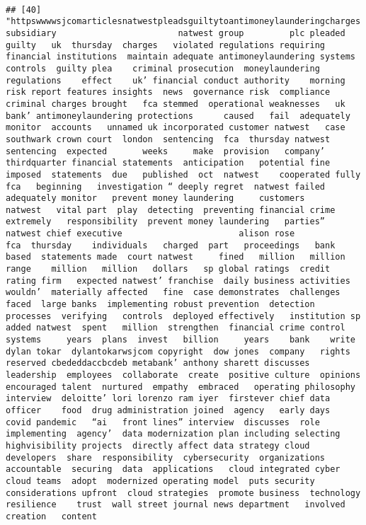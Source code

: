 \documentclass[
]{article}
\begin{document}
\begin{verbatim}
                                                                                                                                                                                                                                                                                                                                                                                                                                                                        
## [40] "httpswwwwsjcomarticlesnatwestpleadsguiltytoantimoneylaunderingcharges  subsidiary                        natwest group         plc pleaded guilty   uk  thursday  charges   violated regulations requiring financial institutions  maintain adequate antimoneylaundering systems  controls  guilty plea    criminal prosecution  moneylaundering regulations    effect    uk’ financial conduct authority    morning risk report features insights  news  governance risk  compliance   criminal charges brought   fca stemmed  operational weaknesses   uk bank’ antimoneylaundering protections      caused   fail  adequately monitor  accounts   unnamed uk incorporated customer natwest   case      southwark crown court  london  sentencing  fca  thursday natwest   sentencing  expected       weeks     make  provision   company’ thirdquarter financial statements  anticipation   potential fine  imposed  statements  due   published  oct  natwest    cooperated fully   fca   beginning   investigation “ deeply regret  natwest failed  adequately monitor   prevent money laundering     customers     natwest   vital part  play  detecting  preventing financial crime    extremely   responsibility  prevent money laundering   parties” natwest chief executive                       alison rose            fca  thursday    individuals   charged  part   proceedings   bank based  statements made  court natwest     fined   million   million  range    million   million   dollars   sp global ratings  credit rating firm   expected natwest’ franchise  daily business activities wouldn’  materially affected   fine  case demonstrates  challenges faced  large banks  implementing robust prevention  detection processes  verifying   controls  deployed effectively   institution sp added natwest  spent   million  strengthen  financial crime control systems     years  plans  invest   billion     years    bank    write  dylan tokar  dylantokarwsjcom copyright  dow jones  company   rights reserved cbededdaccbcdeb metabank’ anthony sharett discusses  leadership  employees  collaborate  create  positive culture  opinions  encouraged talent  nurtured  empathy  embraced   operating philosophy   interview  deloitte’ lori lorenzo ram iyer  firstever chief data officer    food  drug administration joined  agency   early days   covid pandemic   “ai   front lines” interview  discusses  role  implementing  agency’  data modernization plan including selecting highvisibility projects  directly affect data strategy cloud developers  share  responsibility  cybersecurity  organizations  accountable  securing  data  applications   cloud integrated cyber  cloud teams  adopt  modernized operating model  puts security considerations upfront  cloud strategies  promote business  technology resilience    trust  wall street journal news department   involved   creation   content 
\end{verbatim}
\end{document}
